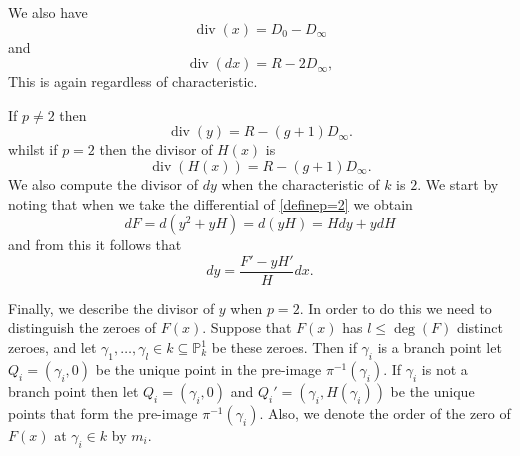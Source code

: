 \documentclass[draft, 11pt]{article} %
\theoremstyle{plain}
\theoremstyle{remark}
\DeclareMathOperator{\di}{div}
\begin{document}
We also have
\begin{equation}\label{divxp=2}
\di (x)  = D_0 - D_\infty
\end{equation}
and
\begin{equation}\label{differentialdivisor}
\di(dx) = R - 2D_\infty,
\end{equation}
This is again regardless of characteristic.

If $p \neq 2$ then 
\begin{equation}\label{pnot2divisors}
\di(y)  = R - (g+1)D_\infty.
\end{equation}
whilst if $p=2$ then the divisor of $H(x)$ is
\begin{equation}\label{divisorofH}
\di (H(x))  = R - (g+1)D_\infty. 
\end{equation}
We also compute the divisor of $dy$ when the characteristic of $k$ is $2$.
We start by noting that when we take the differential of \eqref{definep=2} we obtain
\[
dF = d\left(y^2 + yH \right) = d(yH) = Hdy + ydH
\]
and from this it follows that
\begin{equation}\label{divdyp=2}
dy = \frac{F'-yH'}{H}dx.
\end{equation}

Finally, we describe the divisor of $y$ when $p=2$.
In order to do this we need to distinguish the zeroes of $F(x)$.
Suppose that $F(x)$ has $l \leq \deg(F)$ distinct zeroes, and let $\gamma_1, \ldots, \gamma_l \in k \subseteq \mathbb P_k^1$ be these zeroes.
Then if $\gamma_i$ is a branch point let $Q_i = (\gamma_i, 0)$ be the unique point in the pre-image $\pi^{-1}(\gamma_i)$.
If $\gamma_i$ is not a branch point then let $Q_i = (\gamma_i, 0)$ and $Q_i' = (\gamma_i, H(\gamma_i))$ be the unique points that form the pre-image $\pi^{-1}(\gamma_i)$.
Also, we denote the order of the zero of $F(x)$ at $\gamma_i \in k$ by $m_i$.
\end{document}
